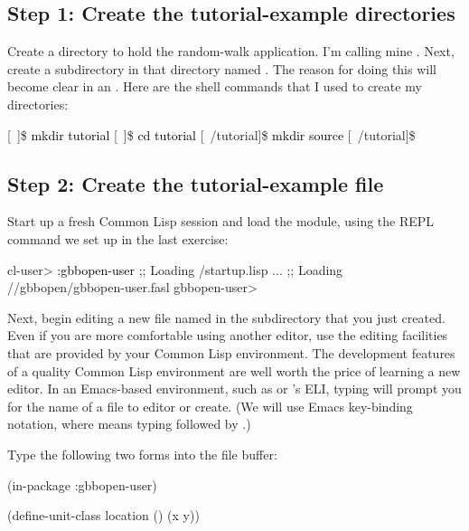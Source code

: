 \documentclass[10pt,twoside,english,pdftex]{article}
\begin{document}
\subsection*{Step 1: Create the tutorial-example directories}

Create a directory to hold the random-walk application.  I'm calling mine
.  Next, create a subdirectory in that directory named
.  The reason for doing this will become clear in an
. Here are the shell commands
that I used to create my directories:
%
\W\supp
\begin{example}
\textcolor{darkergray}{%
  [~]\$ \textcolor{black}{mkdir tutorial}
  [~]\$ \textcolor{black}{cd tutorial}
  [~/tutorial]\$ \textcolor{black}{mkdir source}
  [~/tutorial]\$}
\end{example}

\subsection*{Step 2: Create the tutorial-example file}

Start up a fresh Common Lisp session and load the 
module, using the REPL command we set up in the last exercise:
%
\W\supp
\begin{example}
\textcolor{darkergray}{%
  cl-user> \textcolor{black}{:gbbopen-user}
  ;; Loading /startup.lisp
     ...
  ;; Loading //gbbopen/gbbopen-user.fasl
  gbbopen-user>}
\end{example}

Next, begin editing a new file named  in the
 subdirectory that you just created.  Even if you are more
comfortable using another editor, use the editing facilities that are provided
by your Common Lisp environment.  The development features of a quality Common
Lisp environment are well worth the price of learning a new editor.  In an
Emacs-based environment, such as
 or 's ELI, typing  will prompt you for
the name of a file to editor or create.  (We will use Emacs key-binding
notation, where  means typing  followed by
{}.)

Type the following two forms into the  file
buffer:
%
\W\supp
\begin{example}
  (in-package :gbbopen-user)

  (define-unit-class location ()
    (x y))
\end{example}
\end{document}
